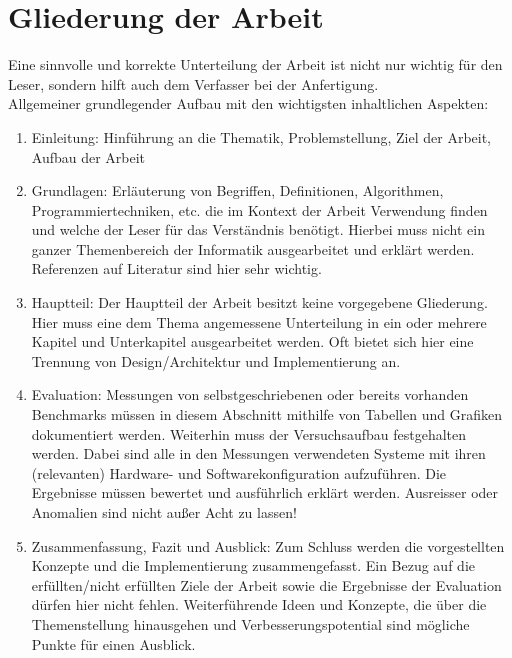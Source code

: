 \chapter{Gliederung der Arbeit}
\label{gliederung}

Eine sinnvolle und korrekte Unterteilung der Arbeit ist nicht nur wichtig für den Leser, sondern hilft auch dem Verfasser bei der Anfertigung.\\
Allgemeiner grundlegender Aufbau mit den wichtigsten inhaltlichen Aspekten:

\begin{enumerate}
 \item Einleitung: Hinführung an die Thematik, Problemstellung, Ziel der Arbeit, Aufbau der Arbeit
 \item Grundlagen: Erläuterung von Begriffen, Definitionen, Algorithmen, Programmiertechniken, etc. die im Kontext der 
 Arbeit Verwendung finden und welche der Leser für das Verständnis benötigt. Hierbei muss nicht ein ganzer Themenbereich der Informatik
 ausgearbeitet und erklärt werden. Referenzen auf Literatur sind hier sehr wichtig.
 \item Hauptteil: Der Hauptteil der Arbeit besitzt keine vorgegebene Gliederung. Hier muss eine dem Thema angemessene Unterteilung in 
 ein oder mehrere Kapitel und Unterkapitel ausgearbeitet werden. Oft bietet sich hier eine Trennung von Design/Architektur und Implementierung an.
 \item Evaluation: Messungen von selbstgeschriebenen oder bereits vorhanden Benchmarks müssen in diesem Abschnitt mithilfe von Tabellen und Grafiken dokumentiert
 werden. Weiterhin muss der Versuchsaufbau festgehalten werden. Dabei sind alle in den Messungen verwendeten Systeme mit ihren (relevanten) Hardware- und Softwarekonfiguration
 aufzuführen. Die Ergebnisse müssen bewertet und ausführlich erklärt werden. Ausreisser oder Anomalien sind nicht außer Acht zu lassen!
 \item Zusammenfassung, Fazit und Ausblick: Zum Schluss werden die vorgestellten Konzepte und die Implementierung zusammengefasst. 
 Ein Bezug auf die erfüllten/nicht erfüllten Ziele der Arbeit sowie die Ergebnisse der Evaluation dürfen hier nicht fehlen. 
 Weiterführende Ideen und Konzepte, die über die Themenstellung hinausgehen und Verbesserungspotential sind mögliche Punkte für einen Ausblick.
\end{enumerate}
